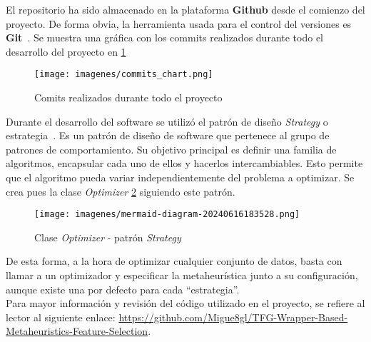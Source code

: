 El repositorio ha sido almacenado en la plataforma \textbf{Github} desde el comienzo del proyecto. De forma obvia, la herramienta usada para el control del versiones es \textbf{Git}~\cite{chacon2014pro}. Se muestra una gráfica con los commits realizados durante todo el desarrollo del proyecto en \ref{fig:commits}

\begin{figure}[htp]
    \centering
    \texttt{[image: imagenes/commits\_chart.png]}
    \caption{Comits realizados durante todo el proyecto}
    \label{fig:commits}
\end{figure}

Durante el desarrollo del software se utilizó el patrón de diseño \textit{Strategy} o estrategia~\cite{refactoring-guru-strategy}. Es un patrón de diseño de software que pertenece al grupo de patrones de comportamiento. Su objetivo principal es definir una familia de algoritmos, encapsular cada uno de ellos y hacerlos intercambiables. Esto permite que el algoritmo pueda variar independientemente del problema a optimizar. Se crea pues la clase \textit{Optimizer} \ref{fig:optimizer_class} siguiendo este patrón.

\begin{figure}[htp]
    \centering
    \texttt{[image: imagenes/mermaid-diagram-20240616183528.png]}
    \caption{Clase \textit{Optimizer} - patrón \textit{Strategy}}
    \label{fig:optimizer_class}
\end{figure}

De esta forma, a la hora de optimizar cualquier conjunto de datos, basta con llamar a un optimizador y especificar la metaheurística junto a su configuración, aunque existe una por defecto para cada ``estrategia''.\\[6pt]
Para mayor información y revisión del código utilizado en el proyecto, se refiere al lector al siguiente enlace: \url{https://github.com/Migue8gl/TFG-Wrapper-Based-Metaheuristics-Feature-Selection}.